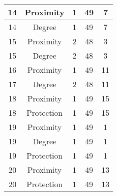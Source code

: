 \documentclass[results.tex]{subfiles}
\begin{document}
\begin{center}
\begin{tabular}{| c || c | c | c | c |}
            \hline
            14                      & Proximity                    & 1                      & 49                      & 7                    \\
            \hline
            14                      & Degree                       & 1                      & 49                      & 7                    \\
            \hline
            15                      & Proximity                    & 2                      & 48                      & 3                    \\
            \hline
            15                      & Degree                       & 2                      & 48                      & 3                    \\
            \hline
            16                      & Proximity                    & 1                      & 49                      & 11                   \\
            \hline
            17                      & Degree                       & 2                      & 48                      & 11                   \\
            \hline
            18                      & Proximity                    & 1                      & 49                      & 15                   \\
            \hline
            18                      & Protection                   & 1                      & 49                      & 15                   \\
            \hline
            19                      & Proximity                    & 1                      & 49                      & 1                    \\
            \hline
            19                      & Degree                       & 1                      & 49                      & 1                    \\
            \hline
            19                      & Protection                   & 1                      & 49                      & 1                    \\
            \hline
            20                      & Proximity                    & 1                      & 49                      & 13                   \\
            \hline
            20                      & Protection                   & 1                      & 49                      & 13                   \\

\end{tabular}
\end{center}
\end{document}
